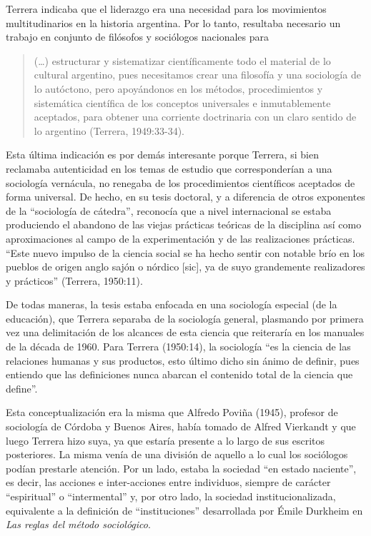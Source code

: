 Terrera indicaba que el liderazgo era una necesidad para los movimientos multitudinarios en la historia argentina. Por lo tanto, resultaba necesario un trabajo en conjunto de filósofos y sociólogos nacionales para

\begin{quote}
(\dots) estructurar y sistematizar científicamente todo el material de lo cultural argentino, pues necesitamos crear una filosofía y una sociología de lo autóctono, pero apoyándonos en los métodos, procedimientos y sistemática científica de los conceptos universales e inmutablemente aceptados, para obtener una corriente doctrinaria con un claro sentido de lo argentino (Terrera, 1949:33-34).
\end{quote}

Esta última indicación es por demás interesante porque Terrera, si bien reclamaba autenticidad en los temas de estudio que corresponderían a una sociología vernácula, no renegaba de los procedimientos científicos aceptados de forma universal. De hecho, en su tesis doctoral, y a diferencia de otros exponentes de la \enquote{sociología de cátedra}, reconocía que a nivel internacional se estaba produciendo el abandono de las viejas prácticas teóricas de la disciplina así como aproximaciones al campo de la experimentación y de las realizaciones prácticas. \enquote{Este nuevo impulso de la ciencia social se ha hecho sentir con notable brío en los pueblos de origen anglo sajón o nórdico [sic], ya de suyo grandemente realizadores y prácticos} (Terrera, 1950:11).

De todas maneras, la tesis estaba enfocada en una sociología especial (de la educación), que Terrera separaba de la sociología general, plasmando por primera vez una delimitación de los alcances de esta ciencia que reiteraría en los manuales de la década de 1960. Para Terrera (1950:14), la sociología \enquote{es la ciencia de las relaciones humanas y sus productos, esto último dicho sin ánimo de definir, pues entiendo que las definiciones nunca abarcan el contenido total de la ciencia que define}.

Esta conceptualización era la misma que Alfredo Poviña (1945), profesor de sociología de Córdoba y Buenos Aires, había tomado de Alfred Vierkandt y que luego Terrera hizo suya, ya que estaría presente a lo largo de sus escritos posteriores. La misma venía de una división de aquello a lo cual los sociólogos podían prestarle atención. Por un lado, estaba la sociedad \enquote{en estado naciente}, es decir, las acciones e inter-acciones entre individuos, siempre de carácter \enquote{espiritual} o \enquote{intermental} y, por otro lado, la sociedad institucionalizada, equivalente a la definición de \enquote{instituciones} desarrollada por Émile Durkheim en \emph{Las reglas del método sociológico}.

